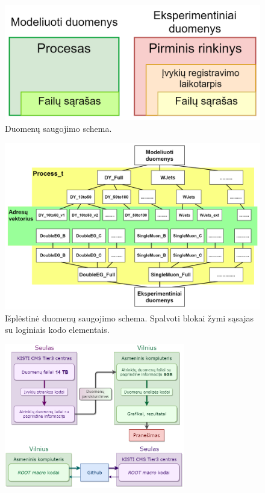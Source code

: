 \documentclass[a4paper, 12pt, twoside]{article}
\begin{document}
\begin{figure}
	\includegraphics[width=\textwidth]{Duomenu_schema_DataMC_v2.png}
	\caption{\label{fig:duomSchem} Duomenų saugojimo schema.}
\end{figure}

\begin{figure}
	\includegraphics[width=\textwidth]{medis_praplestas_spalvotas.png}
	\caption{\label{fig:duomKod} Išplėstinė duomenų saugojimo schema. Spalvoti blokai žymi sąsajas su loginiais
	kodo elementais.}
\end{figure}

\begin{figure}
	\includegraphics[width=0.7\textwidth]{Duomenu_panaudojimo_schema.png}
\end{figure}
\end{document}

